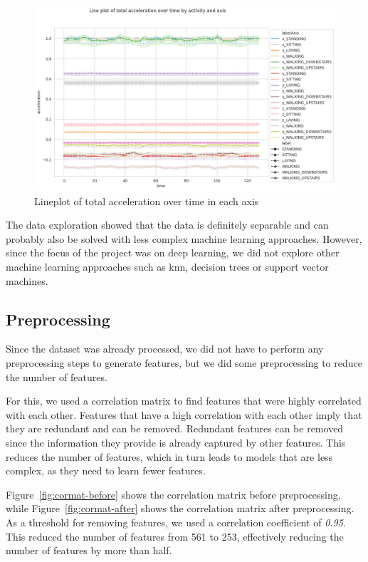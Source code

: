 \begin{figure}[ht]
    \centering
    \includegraphics[width=\textwidth]{./img/lineplot}
    \caption{Lineplot of total acceleration over time in each axis}
    \label{fig:lineplot}
\end{figure}

The data exploration showed that the data is definitely separable and can probably also be solved with less complex machine learning approaches.
However, since the focus of the project was on deep learning, we did not explore other machine learning approaches such as knn, decision trees or support vector machines.

\subsection{Preprocessing}\label{subsec:preprocessing}

Since the dataset was already processed, we did not have to perform any preprocessing steps to generate features, but we did some preprocessing to reduce the number of features.


For this, we used a correlation matrix to find features that were highly correlated with each other.
Features that have a high correlation with each other imply that they are redundant and can be removed.
Redundant features can be removed since the information they provide is already captured by other features.
This reduces the number of features, which in turn leads to models that are less complex, as they need to learn fewer features.

Figure~\ref{fig:cormat-before} shows the correlation matrix before preprocessing, while Figure~\ref{fig:cormat-after} shows the correlation matrix after preprocessing.
As a threshold for removing features, we used a correlation coefficient of \emph{0.95}.
This reduced the number of features from 561 to 253, effectively reducing the number of features by more than half.

